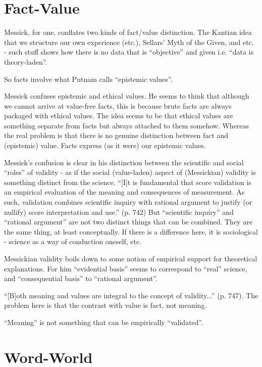 \documentclass[11pt,twoside]{article}
\begin{document}
\section{Fact-Value}

Messick, for one, conflates two kinds of fact/value distinction.  The
Kantian idea that we structure our own experience (etc.), Sellars'
Myth of the Given, and etc. - such stuff shows how there is no data
that is ``objective'' and given i.e. ``data is theory-laden''.

So facts involve what Putnam calls ``epistemic values''.

Messick confuses epistemic and ethical values.  He seems to think that
although we cannot arrive at value-free facts, this is because brute
facts are always packaged with ethical values.  The idea seems to be
that ethical values are something separate from facts but always
attached to them somehow.  Whereas the real problem is that there is
no genuine distinction between fact and (epistemic) value.  Facts
express (as it were) our epistemic values.

Messick's confusion is clear in his distinction between the scientific
and social ``roles'' of validity - as if the social (value-laden)
aspect of (Messickian) validity is something distinct from the
science.  ``[I]t is fundamental that score validation is an empirical
evaluation of the meaning and consequences of measurement.  As such,
validation combines scientific inquiry with rational argument to
justify (or nullify) score interpretation and use.'' (p. 742) But
``scientific inquiry'' and ``rational argument'' are not two distinct
things that can be combined.  They are the same thing, at least
conceptually.  If there is a difference here, it is sociological -
science as a way of conduction oneself, etc.

Messickian validity boils down to some notion of empirical support for
theoretical explanations.  For him ``evidential basis'' seems to
correspond to ``real'' science, and ``consequential basis'' to
``rational argument''.

``[B]oth meaning and values are integral to the concept of
validity...'' (p. 747).  The problem here is that the contrast with
value is fact, not meaning.

``Meaning'' is not something that can be empirically ``validated''.

\section{Word-World}
\end{document}
